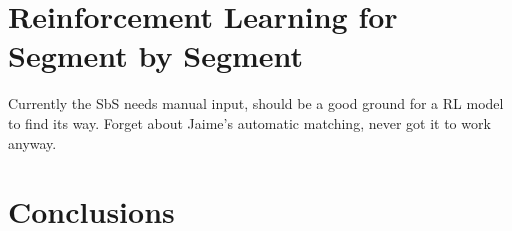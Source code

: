 
\section{Reinforcement Learning for Segment by Segment}

Currently the SbS needs manual input, should be a good ground for a RL model to find its way.
Forget about Jaime's automatic matching, never got it to work anyway.


\section{Conclusions}

